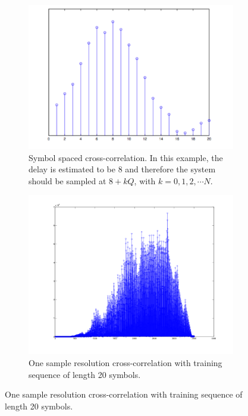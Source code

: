 \documentclass[12pt,a4paper,openright]{report}
\begin{document}
\begin{figure}[H] 
  \begin{subfigure}[b]{0.5\linewidth}
    \centering
    \includegraphics[width=1\linewidth]{ss.pdf} 
    \caption{Symbol spaced cross-correlation. In this example, the delay is estimated to be 8 and therefore the system should be sampled at $8+kQ$, with $k=0 , 1, 2,\cdots N$.} 
    \label{fig:a} 
    \vspace{4ex}
  \end{subfigure}%
  \quad
  \begin{subfigure}[b]{0.5\linewidth}
    \centering
    \includegraphics[width=1\linewidth]{20.png} 
    \caption{One sample resolution cross-correlation with training sequence of length 20 symbols.  \\} 

\end{subfigure}
\end{figure}
\end{document}
